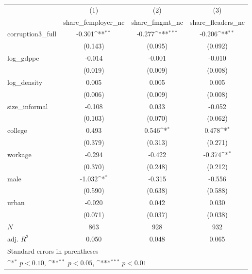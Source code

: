 {
\def\sym#1{\ifmmode^{#1}\else\(^{#1}\)\fi}
\begin{tabular}{l*{3}{c}}
\hline\hline
            &\multicolumn{1}{c}{(1)}&\multicolumn{1}{c}{(2)}&\multicolumn{1}{c}{(3)}\\
            &\multicolumn{1}{c}{share\_femployer\_nc}&\multicolumn{1}{c}{share\_fmgmt\_nc}&\multicolumn{1}{c}{share\_fleaders\_nc}\\
\hline
corruption3\_full&      -0.301\sym{**} &      -0.277\sym{***}&      -0.206\sym{**} \\
            &     (0.143)         &     (0.095)         &     (0.092)         \\
[1em]
log\_gdppc   &      -0.014         &      -0.001         &      -0.010         \\
            &     (0.019)         &     (0.009)         &     (0.008)         \\
[1em]
log\_density &       0.005         &       0.005         &       0.005         \\
            &     (0.006)         &     (0.009)         &     (0.008)         \\
[1em]
size\_informal&      -0.108         &       0.033         &      -0.052         \\
            &     (0.103)         &     (0.070)         &     (0.062)         \\
[1em]
college     &       0.493         &       0.546\sym{*}  &       0.478\sym{*}  \\
            &     (0.379)         &     (0.313)         &     (0.271)         \\
[1em]
workage     &      -0.294         &      -0.422         &      -0.374\sym{*}  \\
            &     (0.370)         &     (0.248)         &     (0.212)         \\
[1em]
male        &      -1.032\sym{*}  &      -0.315         &      -0.556         \\
            &     (0.590)         &     (0.638)         &     (0.588)         \\
[1em]
urban       &      -0.020         &       0.042         &       0.030         \\
            &     (0.071)         &     (0.037)         &     (0.038)         \\
\hline
\(N\)       &         863         &         928         &         932         \\
adj. \(R^{2}\)&       0.050         &       0.048         &       0.065         \\
\hline\hline
\multicolumn{4}{l}{\footnotesize Standard errors in parentheses}\\
\multicolumn{4}{l}{\footnotesize \sym{*} \(p<0.10\), \sym{**} \(p<0.05\), \sym{***} \(p<0.01\)}\\
\end{tabular}
}
